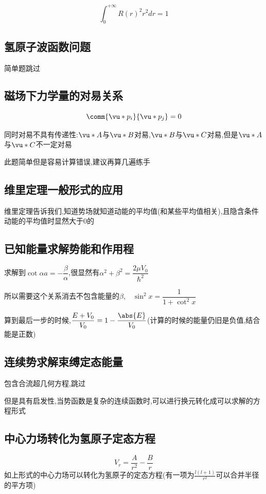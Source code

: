             $$ \int_{0}^{+\infty} R(r)^{2}r^{2}dr = 1 $$

        \subsection{氢原子波函数问题}
            简单题跳过
        
        \subsection{磁场下力学量的对易关系}
            $$ \comm{\vu*{p}_{i}}{\vu*{p}_{j}} = 0 $$

            同时对易不具有传递性:$ \vu*{A} $与$ \vu*{B} $对易,$ \vu*{B} $与$ \vu*{C} $对易,但是$ \vu*{A} $与$ \vu*{C} $不一定对易

            此题简单但是容易计算错误,建议再算几遍练手

        \subsection{维里定理一般形式的应用}
            维里定理告诉我们,知道势场就知道动能的平均值(和某些平均值相关),且隐含条件动能的平均值时显然大于0的

        \subsection{已知能量求解势能和作用程}
            求解到$ \cot{\alpha a} = - \dfrac{\beta}{\alpha} $,很显然有$ \alpha^{2} + \beta^{2} = \dfrac{2\mu V_{0}}{\hbar^{2}}  $
            
            所以需要这个关系消去不包含能量的$\beta$,$ \quad \sin^{2}{x} = \dfrac{1}{1 + \cot^{2}{x}} $

            算到最后一步的时候,$ \dfrac{E+V_{0}}{V_{0}} = 1 - \dfrac{\abs{E}}{V_{0}} $(计算的时候的能量仍旧是负值,结合能是正数)

        \subsection{连续势求解束缚定态能量}
            包含合流超几何方程,跳过
            
            但是具有启发性,当势函数是复杂的连续函数时,可以进行换元转化成可以求解的方程形式
            
        \subsection{中心力场转化为氢原子定态方程}
        $$ V_{r} = \frac{A}{r^{2}} - \frac{B}{r} $$
        如上形式的中心力场可以转化为氢原子的定态方程(有一项为$\frac{l(l+1)}{r^{2}}$可以合并半径的平方项)

